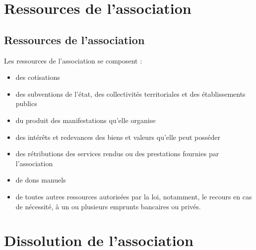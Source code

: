 \documentclass[a4paper,french,10pt]{article}
\begin{document}




\section{Ressources de l’association}

\subsection{Ressources de l’association}
\label{sec:ressources}
Les ressources de l’association se composent :
\begin{itemize}
\item des cotisations
  
\item des subventions de l’état, des collectivités territoriales et
des établissements publics

\item du produit des manifestations qu’elle organise

\item des intérêts et redevances des biens et valeurs qu’elle peut
posséder

\item des rétributions des services rendus ou des prestations fournies
par l'association

\item de dons manuels

\item de toutes autres ressources autorisées par la loi, notamment, le
recours en cas de nécessité, à un ou plusieurs emprunts bancaires ou
privés.
\end{itemize}


\section{Dissolution de l’association}
\end{document}
